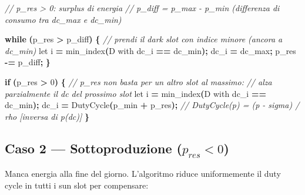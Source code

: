 \documentclass[
  italian,
  openany]{book}
\newenvironment{Shaded}{\begin{snugshade}}{\end{snugshade}}
\newcommand{\CommentTok}[1]{\textcolor[rgb]{0.56,0.35,0.01}{\textit{#1}}}
\newcommand{\ControlFlowTok}[1]{\textcolor[rgb]{0.13,0.29,0.53}{\textbf{#1}}}
\newcommand{\DecValTok}[1]{\textcolor[rgb]{0.00,0.00,0.81}{#1}}
\newcommand{\NormalTok}[1]{#1}
\newcommand{\OperatorTok}[1]{\textcolor[rgb]{0.81,0.36,0.00}{\textbf{#1}}}
\begin{document}
\begin{Shaded}
\begin{Highlighting}[]
\CommentTok{// p\_res \textgreater{} 0: surplus di energia}
\CommentTok{// p\_diff = p\_max {-} p\_min (differenza di consumo tra dc\_max e dc\_min)}

\ControlFlowTok{while} \OperatorTok{(}\NormalTok{p\_res }\OperatorTok{\textgreater{}}\NormalTok{ p\_diff}\OperatorTok{)} \OperatorTok{\{}
    \CommentTok{// prendi il dark slot con indice minore (ancora a dc\_min)}
\NormalTok{    let i }\OperatorTok{=}\NormalTok{ min\_index}\OperatorTok{(}\NormalTok{D with dc\_i }\OperatorTok{==}\NormalTok{ dc\_min}\OperatorTok{);}
\NormalTok{    dc\_i }\OperatorTok{=}\NormalTok{ dc\_max}\OperatorTok{;}
\NormalTok{    p\_res }\OperatorTok{{-}=}\NormalTok{ p\_diff}\OperatorTok{;}
\OperatorTok{\}}

\ControlFlowTok{if} \OperatorTok{(}\NormalTok{p\_res }\OperatorTok{\textgreater{}} \DecValTok{0}\OperatorTok{)} \OperatorTok{\{}
    \CommentTok{// p\_res non basta per un altro slot al massimo:}
    \CommentTok{// alza parzialmente il dc del prossimo slot}
\NormalTok{    let i }\OperatorTok{=}\NormalTok{ min\_index}\OperatorTok{(}\NormalTok{D with dc\_i }\OperatorTok{==}\NormalTok{ dc\_min}\OperatorTok{);}
\NormalTok{    dc\_i }\OperatorTok{=}\NormalTok{ DutyCycle}\OperatorTok{(}\NormalTok{p\_min }\OperatorTok{+}\NormalTok{ p\_res}\OperatorTok{);}
    \CommentTok{// DutyCycle(p) = (p {-} sigma) / rho  [inversa di p(dc)]}
\OperatorTok{\}}
\end{Highlighting}
\end{Shaded}

\subsection{\texorpdfstring{Caso 2 --- Sottoproduzione
(\(p_{res} < 0\))}{Caso 2 --- Sottoproduzione (p\_\{res\} \textless{} 0)}}\label{caso-2-sottoproduzione-p_res-0}

Manca energia alla fine del giorno. L'algoritmo riduce uniformemente il
duty cycle in tutti i sun slot per compensare:
\end{document}
